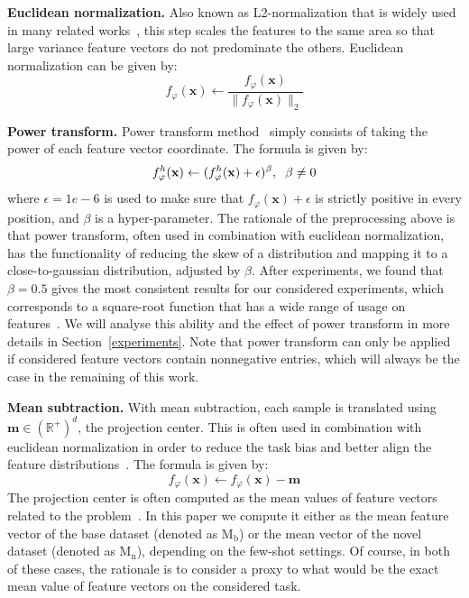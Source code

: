 \documentclass[review]{elsarticle}
\begin{document}
\textbf{Euclidean normalization.} Also known as L2-normalization that is widely used in many related works~\cite{DBLP:journals/corr/abs-1911-04623, DBLP:conf/iclr/YangLX21, hu2021graph}, this step scales the features to the same area so that large variance feature vectors do not predominate the others. Euclidean normalization can be given by:
\begin{equation}
f_\varphi(\mathbf{x}) \leftarrow \frac{f_\varphi(\mathbf{x})}{\|f_\varphi(\mathbf{x})\|_2}
\label{eq:preprocessing_norm}
\end{equation}

\textbf{Power transform.} Power transform method~\cite{tukey1977exploratory,hu2021leveraging} simply consists of taking the power of each feature vector coordinate. The formula is given by:
\begin{equation}
f^{h}_\varphi(\mathbf{x}) \leftarrow (f^{h}_\varphi(\mathbf{x})+\epsilon)^{\beta}, \hspace{0.2cm} \beta \neq 0 
\label{eq:preprocessing_pt}
\end{equation}
where $\epsilon = 1e-6$ is used to make sure that $f_\varphi(\mathbf{x})+\epsilon$ is strictly positive in every position, and $\beta$ is a hyper-parameter. The rationale of the preprocessing above is that power transform, often used in combination with euclidean normalization, has the functionality of reducing the skew of a distribution and mapping it to a close-to-gaussian distribution, adjusted by $\beta$. After experiments, we found that $\beta=0.5$ gives the most consistent results for our considered experiments, which corresponds to a square-root function that has a wide range of usage on features~\cite{cinbis2015approximate}. We will analyse this ability and the effect of power transform in more details in Section~\ref{experiments}. Note that power transform can only be applied if considered feature vectors contain nonnegative entries, which will always be the case in the remaining of this work.

\textbf{Mean subtraction.} With mean subtraction, each sample is translated using $\mathbf{\mathbf{m}}\in{\left({\mathbb{R}^+}\right)}^d$, the projection center. This is often used in combination with euclidean normalization in order to reduce the task bias and better align the feature distributions~\cite{lichtenstein2020tafssl}. The formula is given by: 
\begin{equation}
f_\varphi(\mathbf{x}) \leftarrow f_\varphi(\mathbf{x}) - \mathbf{\mathbf{m}}
\label{eq:preprocessing_submean}
\end{equation}
The projection center is often computed as the mean values of feature vectors related to the problem~\cite{DBLP:journals/corr/abs-1911-04623, lichtenstein2020tafssl}. In this paper we compute it either as the mean feature vector of the base dataset (denoted as $\mathrm{M_b}$) or the mean vector of the novel dataset (denoted as $\mathrm{M_n}$), depending on the few-shot settings. Of course, in both of these cases, the rationale is to consider a proxy to what would be the exact mean value of feature vectors on the considered task.
\end{document}
